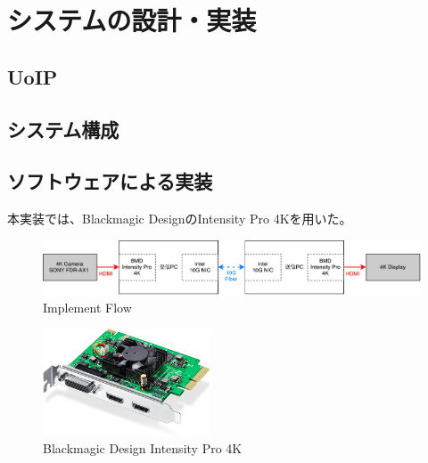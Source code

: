\chapter{システムの設計・実装}
\label{chap:implementation}


\section{UoIP} %

\section{システム構成}

\section{ソフトウェアによる実装}


本実装では、Blackmagic DesignのIntensity Pro 4Kを用いた。

\begin{figure}[htbp]
    \begin{center}
        \includegraphics[bb=0 0 841 121,width=15.5cm]{img/software-implement-flow.pdf}
    \end{center}
    \caption{Implement Flow}
    \label{fig:software-implement-flow}
\end{figure}

\begin{figure}[htbp]
    \begin{center}
        \includegraphics[bb=0 0 644 410,width=5cm]{img/bmd-intensity-pro-4k.jpg}
    \end{center}
    \caption{Blackmagic Design Intensity Pro 4K}
    \label{fig:ted-4k-fmc-card}
\end{figure}

